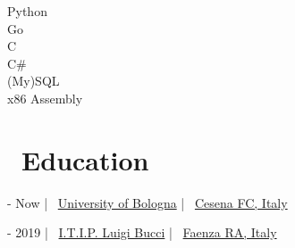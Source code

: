\documentclass{article}
\begin{document}
\begin{paracol}{2}
\begin{tcolorbox}[title=\faCode \ Programming,colback=white,arc=0pt]
     Python \\[0pt]
     Go \\[4pt]
     C \\[4pt]
     C\# \\[4pt]
     (My)SQL \\[4pt]
     x86 Assembly
\end{tcolorbox}

\vspace{35pt}
\begin{center}
    \hypersetup{urlcolor=black}
\end{center}
\vspace{35pt}

\switchcolumn

\maketitle

%
%

\vfill

\section*{\faGraduationCap \ Education}

\begin{tcolorbox}[
    title=\faBookOpen \ \href
        {https://corsi.unibo.it/1cycle/ComputerScienceEngineering}
        {Bachelor in Computer Science and Engineering}
    ,
    colback=white,
    arc=0pt
]
     - Now \hfill | \hfill
    \faUniversity \ \href{https://www.unibo.it/en/}{University of Bologna} \hfill | \hfill
    \faCity \ \href{https://www.openstreetmap.org/relation/9713588}{Cesena FC, Italy}
\end{tcolorbox}

\begin{tcolorbox}[title=\faBook \ High School Diploma in Information Technology,colback=white,arc=0pt]
     - 2019 \hfill | \hfill
    \faSchool \ \href{https://www.itipfaenza.edu.it/}{I.T.I.P. Luigi Bucci} \hfill | \hfill
    \faCity \ \href{https://www.openstreetmap.org/relation/2227656}{Faenza RA, Italy}
\end{tcolorbox}


\end{paracol}
\end{document}
